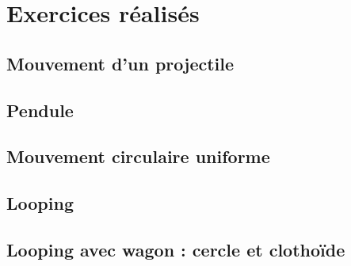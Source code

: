 
\chapter{Exercices réalisés}\label{chap:exercices}

\section{Mouvement d'un projectile}

\section{Pendule}

\section{Mouvement circulaire uniforme}

\section{Looping}

\section{Looping avec wagon : cercle et clothoïde}
